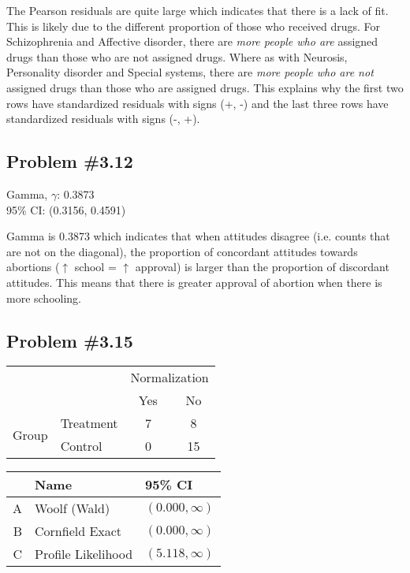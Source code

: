 \documentclass[12pt, letterpaper]{article}
\begin{document}
The Pearson residuals are quite large which indicates that there is a lack of fit.  This is likely due to the different proportion of those who received drugs.  For Schizophrenia and Affective disorder, there are\textit{ more people who are} assigned drugs than those who are not assigned drugs.  Where as with Neurosis, Personality disorder and Special systems, there are \textit{more people who are not} assigned drugs than those who are assigned drugs.  This explains why the first two rows have standardized residuals with signs (+, -) and the last three rows have standardized residuals with signs (-, +).  

\subsection*{Problem {\#}3.12}
Gamma, $\gamma$: 0.3873 \\
95\% CI: (0.3156, 0.4591)

Gamma is 0.3873 which indicates that when attitudes disagree (i.e. counts that are not on the diagonal), the proportion of concordant attitudes towards abortions ($\uparrow$ school = $\uparrow$ approval) is larger than the proportion of discordant attitudes.  This means that there is greater approval of abortion when there is more schooling.  

\subsection*{Problem {\#}3.15}

\begin{tabular}{c l cc }
	&			& \multicolumn{2}{c}{Normalization} \\
	&			& Yes	& No	\\ \cline{3-4} 
	\multirow{2}{*}{Group} & Treatment	& \multicolumn{1}{|c}{7}	& \multicolumn{1}{|c|}{8}\\ \cline{3-4} 
	& Control							& \multicolumn{1}{|c}{0}	& \multicolumn{1}{|c|}{15} \\ \cline{3-4}
\end{tabular} 
\hfill 
	\begin{tabular}{rll}
		\hline
		& Name  & 95\% CI  \\	\hline
		A & Woolf (Wald) & $(0.000, \infty) $ \\
		B & Cornfield Exact & $(0.000, \infty)$ \\
		C & Profile Likelihood & $(5.118, \infty)$  \\ 
		\hline
	\end{tabular} 
\hfill 
\phant \\
\end{document}
